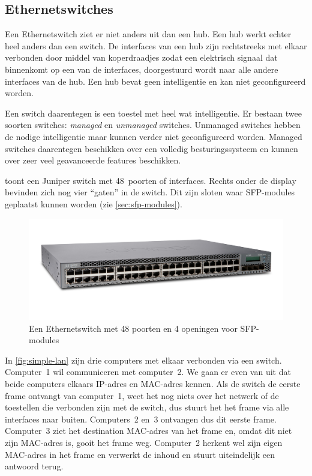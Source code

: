 \subsection{Ethernetswitches}

Een Ethernetswitch ziet er niet anders uit dan een hub.
Een hub werkt echter heel anders dan een switch.
De interfaces van een hub zijn rechtstreeks met elkaar verbonden door middel van koperdraadjes zodat een elektrisch signaal dat binnenkomt op een van de interfaces, doorgestuurd wordt naar alle andere interfaces van de hub.
Een hub bevat geen intelligentie en kan niet geconfigureerd worden.

Een switch daarentegen is een toestel met heel wat intelligentie.
Er bestaan twee soorten switches: \emph{managed} en \emph{unmanaged} switches.
Unmanaged switches hebben de nodige intelligentie maar kunnen verder niet geconfigureerd worden.
Managed switches daarentegen beschikken over een volledig besturingssysteem en kunnen over zeer veel geavanceerde features beschikken.

 toont een Juniper switch met 48~poorten of interfaces.
Rechts onder de display bevinden zich nog vier ``gaten'' in de switch.
Dit zijn sloten waar SFP-modules geplaatst kunnen worden (zie \vref{sec:sfp-modules}).

\begin{figure}
    \centering
    \includegraphics[width=\textwidth]{images/ethernetswitch.jpg}
    \caption{Een Ethernetswitch met 48 poorten en 4 openingen voor SFP-modules}
    \label{fig:ethernetswitch}
\end{figure}


In \vref{fig:simple-lan} zijn drie computers met elkaar verbonden via een switch.
Computer~1 wil communiceren met computer~2.
We gaan er even van uit dat beide computers elkaars IP-adres en MAC-adres kennen.
Als de switch de eerste frame ontvangt van computer~1, weet het nog niets over het netwerk of de toestellen die verbonden zijn met de switch, dus stuurt het het frame via alle interfaces naar buiten.
Computers~2 en~3 ontvangen dus dit eerste frame.
Computer~3 ziet het destination MAC-adres van het frame en, omdat dit niet zijn MAC-adres is, gooit het frame weg.
Computer~2 herkent wel zijn eigen MAC-adres in het frame en verwerkt de inhoud en stuurt uiteindelijk een antwoord terug.

